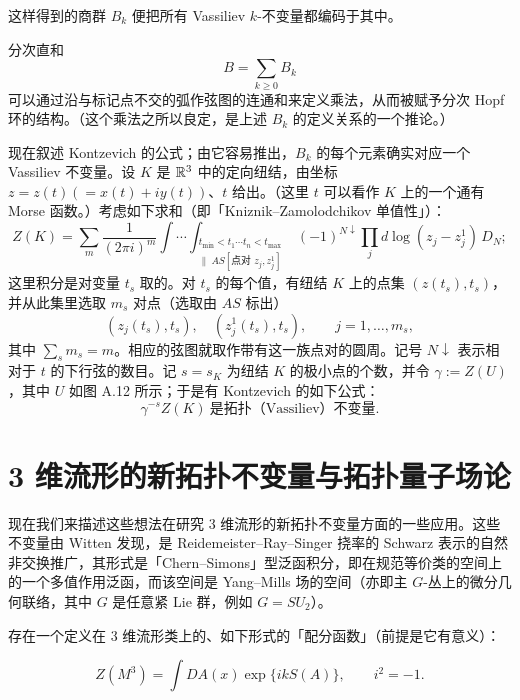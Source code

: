 这样得到的商群 $B_k$ 便把所有 Vassiliev $k$-不变量都编码于其中。


分次直和
\[
B=\sum_{k\ge0}B_k
\]
可以通过沿与标记点不交的弧作弦图的连通和来定义乘法，从而被赋予分次 Hopf 环的结构。（这个乘法之所以良定，是上述 $B_k$ 的定义关系的一个推论。）

现在叙述 Kontzevich 的公式；由它容易推出，$B_k$ 的每个元素确实对应一个 Vassiliev 不变量。设 $K$ 是 $\mathbb{R}^3$ 中的定向纽结，由坐标 $z=z(t)(=x(t)+iy(t))$、$t$ 给出。（这里 $t$ 可以看作 $K$ 上的一个通有 Morse 函数。）考虑如下求和（即「Kniznik--Zamolodchikov 单值性」）：
\[
Z(K)=\sum_m\frac{1}{(2\pi i)^m}\int\cdots\int_{\substack{t_{\min}<t_1\cdots t_n<t_{\max}\\ \|\ AS[\text{点对 } z_j,z_j^1]}}(-1)^{N\downarrow}\prod_j d\log(z_j-z_j^1)\,D_N;
\]
这里积分是对变量 $t_s$ 取的。对 $t_s$ 的每个值，有纽结 $K$ 上的点集 $(z(t_s),t_s)$，并从此集里选取 $m_s$ 对点（选取由 $AS$ 标出）
\[
(z_j(t_s),t_s),\quad (z_j^1(t_s),t_s),\qquad j=1,\dots,m_s,
\]
其中 $\sum_s m_s=m$。相应的弦图就取作带有这一族点对的圆周。记号 $N\downarrow$ 表示相对于 $t$ 的下行弦的数目。记 $s=s_K$ 为纽结 $K$ 的极小点的个数，并令 $\gamma:=Z(U)$，其中 $U$ 如图 A.12 所示；于是有 Kontzevich 的如下公式：
\[
\gamma^{-s}Z(K)\ \text{是拓扑（Vassiliev）不变量}.
\]


\section{3 维流形的新拓扑不变量与拓扑量子场论}


现在我们来描述这些想法在研究 3 维流形的新拓扑不变量方面的一些应用。这些不变量由 Witten 发现，是 Reidemeister--Ray--Singer 挠率的 Schwarz 表示的自然非交换推广，其形式是「Chern--Simons」型泛函积分，即在规范等价类的空间上的一个多值作用泛函，而该空间是 Yang--Mills 场的空间（亦即主 $G$-丛上的微分几何联络，其中 $G$ 是任意紧 Lie 群，例如 $G=SU_2$）。

存在一个定义在 3 维流形类上的、如下形式的「配分函数」（前提是它有意义）：

\[
Z(M^3)=\int DA(x)\exp\{ikS(A)\},\qquad i^2=-1.
\]

